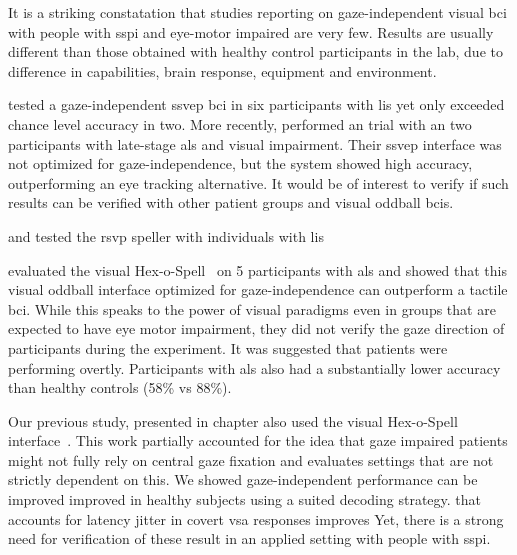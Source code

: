 It is a striking constatation that studies reporting on
gaze-independent visual \ac{bci} with people with \ac{sspi} and eye-motor
impaired are very few.
Results are usually different than those obtained with healthy control
participants in the lab, due to difference in capabilities, brain
response, equipment and environment.

\textcite{Lesenfants2014} tested a gaze-independent \ac{ssvep} \ac{bci} in six
participants with \ac{lis} yet only exceeded chance level accuracy in two.
More recently, \textcite{Peters2020} performed an trial with an
two participants with late-stage \ac{als} and visual impairment.
Their \ac{ssvep} interface was not optimized for gaze-independence, but the
system showed high accuracy, outperforming an eye tracking alternative.
It would be of interest to verify if such results can be verified with other
patient groups and visual oddball \acp{bci}.

\textcite{Orhan2012} and \textcite{Oken2014} tested the \ac{rsvp} speller with
individuals with \ac{lis}

\textcite{Severens2014} evaluated the visual Hex-o-Spell~\cite{Treder2010} on 5
participants with \ac{als} and showed that this visual oddball interface optimized
for gaze-independence can outperform a tactile \ac{bci}.
While this speaks to the power of visual paradigms even in groups that are
expected to have eye motor impairment, they did not verify the gaze direction
of participants during the experiment.
It was suggested that patients were performing overtly.
Participants with \ac{als} also had a substantially lower accuracy than healthy
controls (58\% vs 88\%).




Our previous study, presented in chapter  also used the
visual Hex-o-Spell interface~\cite{VanDenKerchove2024}.
This work partially accounted for the idea that gaze impaired patients might
not fully rely on central gaze fixation and evaluates settings that are not
strictly dependent on this.
We showed gaze-independent performance can be improved
improved in healthy subjects using a suited decoding strategy.
that accounts for latency jitter in covert \ac{vsa} responses improves
Yet, there is a strong need for verification of these result in an applied
setting with people with \ac{sspi}.


